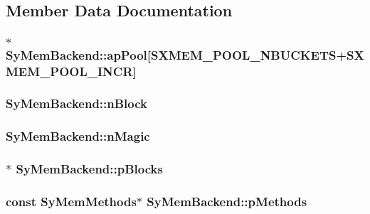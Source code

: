 \subsection{Member Data Documentation}
\hypertarget{struct_sy_mem_backend_a669f5ba6ba076b587c7e733bf96f1636}{
\subsubsection[{ap\-Pool}]{$\ast$ Sy\-Mem\-Backend\-::ap\-Pool\mbox{[}{\bf S\-X\-M\-E\-M\-\_\-\-P\-O\-O\-L\-\_\-\-N\-B\-U\-C\-K\-E\-T\-S}+{\bf S\-X\-M\-E\-M\-\_\-\-P\-O\-O\-L\-\_\-\-I\-N\-C\-R}\mbox{]}}}\label{d0/dc7/struct_sy_mem_backend_a669f5ba6ba076b587c7e733bf96f1636}
\hypertarget{struct_sy_mem_backend_a378cd197f9a80d521edc1858eeea59d2}{
\subsubsection[{n\-Block}]{ Sy\-Mem\-Backend\-::n\-Block}}\label{d0/dc7/struct_sy_mem_backend_a378cd197f9a80d521edc1858eeea59d2}
\hypertarget{struct_sy_mem_backend_a56806bb37f790b073a00ff10c9684d1d}{
\subsubsection[{n\-Magic}]{ Sy\-Mem\-Backend\-::n\-Magic}}\label{d0/dc7/struct_sy_mem_backend_a56806bb37f790b073a00ff10c9684d1d}
\hypertarget{struct_sy_mem_backend_a2ba2058b8d89b88dce66c81a5e18c386}{
\subsubsection[{p\-Blocks}]{$\ast$ Sy\-Mem\-Backend\-::p\-Blocks}}\label{d0/dc7/struct_sy_mem_backend_a2ba2058b8d89b88dce66c81a5e18c386}
\hypertarget{struct_sy_mem_backend_a4db10b2661b2584547103d596da8d2f3}{
\subsubsection[{p\-Methods}]{\setlength{\rightskip}{0pt plus 5cm}const {\bf Sy\-Mem\-Methods}$\ast$ Sy\-Mem\-Backend\-::p\-Methods}}\label{d0/dc7/struct_sy_mem_backend_a4db10b2661b2584547103d596da8d2f3}
